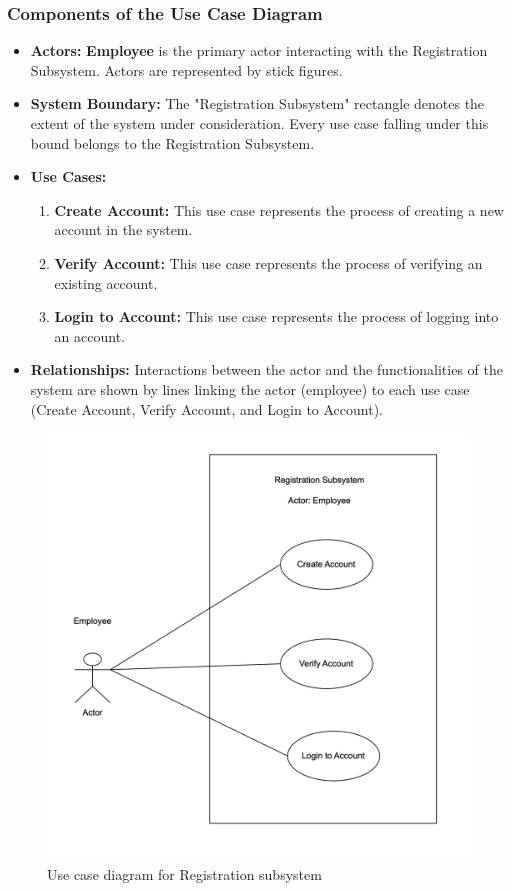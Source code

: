 \subsubsection{Components of the Use Case Diagram }
\begin{itemize}
    \item \textbf{Actors: }\textbf{Employee} is the primary actor interacting with the Registration Subsystem. Actors are represented by stick figures.
    \item \textbf{System Boundary: }The "Registration Subsystem" rectangle denotes the extent of the system under consideration. Every use case falling under this bound belongs to the Registration Subsystem.
    \item \textbf{Use Cases: }
    \begin{enumerate}
        \item \textbf{Create Account: }This use case represents the process of creating a new account in the system. 
        \item \textbf{Verify Account: }This use case represents the process of verifying an existing account. 
        \item \textbf{Login to Account: } This use case represents the process of logging into an account. 
    \end{enumerate} 
    \item \textbf{Relationships: }Interactions between the actor and the functionalities of the system are shown by lines linking the actor (employee) to each use case (Create Account, Verify Account, and Login to Account). 
\end{itemize}


\begin{figure}[h!t]
    \centering
    \includegraphics[width=\textwidth]{images/ucRegistration.png}
    \caption{Use case diagram for Registration subsystem}
    \label{fig:ucRegistration}
\end{figure}

